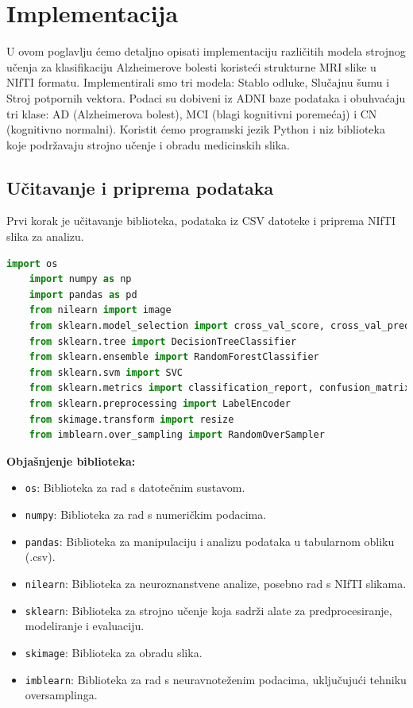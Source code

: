 \documentclass[zavrsnirad,upload]{fer}
\begin{document}
\section{Implementacija}
U ovom poglavlju ćemo detaljno opisati implementaciju različitih modela strojnog učenja za klasifikaciju Alzheimerove bolesti koristeći strukturne MRI slike u NIfTI formatu. Implementirali smo tri modela: Stablo odluke, Slučajnu šumu i Stroj potpornih vektora. Podaci su dobiveni iz ADNI baze podataka i obuhvaćaju tri klase: AD (Alzheimerova bolest), MCI (blagi kognitivni poremećaj) i CN (kognitivno normalni). Koristit ćemo programski jezik Python i niz biblioteka koje podržavaju strojno učenje i obradu medicinskih slika.

\subsection{Učitavanje i priprema podataka}
Prvi korak je učitavanje biblioteka, podataka iz CSV datoteke i priprema NIfTI slika za analizu.

\begin{lstlisting}[language=Python, caption={Učitavanje Python biblioteka}]
	import os
	import numpy as np
	import pandas as pd
	from nilearn import image
	from sklearn.model_selection import cross_val_score, cross_val_predict
	from sklearn.tree import DecisionTreeClassifier
	from sklearn.ensemble import RandomForestClassifier
	from sklearn.svm import SVC
	from sklearn.metrics import classification_report, confusion_matrix
	from sklearn.preprocessing import LabelEncoder
	from skimage.transform import resize
	from imblearn.over_sampling import RandomOverSampler
\end{lstlisting}

\noindent \textbf{Objašnjenje biblioteka:}
\begin{itemize}
	\item \texttt{os}: Biblioteka za rad s datotečnim sustavom.
	\item \texttt{numpy}: Biblioteka za rad s numeričkim podacima.
	\item \texttt{pandas}: Biblioteka za manipulaciju i analizu podataka u tabularnom obliku (.csv).
	\item \texttt{nilearn}: Biblioteka za neuroznanstvene analize, posebno rad s NIfTI slikama.
	\item \texttt{sklearn}: Biblioteka za strojno učenje koja sadrži alate za predprocesiranje, modeliranje i evaluaciju.
	\item \texttt{skimage}: Biblioteka za obradu slika.
	\item \texttt{imblearn}: Biblioteka za rad s neuravnoteženim podacima, uključujući tehniku oversamplinga.
\end{itemize}
\end{document}
